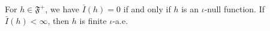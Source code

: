 For $h \in \mathfrak{F}^+$, we have $\bar{I}(h) = 0$ if and only if $h$ is an $\iota$-null function. If $\bar{I}(h) < \infty$, then $h$ is finite $\iota$-a.e.